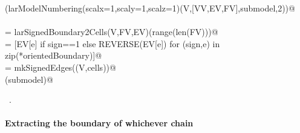 \documentclass[11pt,oneside]{article}    %
\begin{document}
\begin{flushleft}
\begin{list}{}{}
\mbox{}\verb@VIEW(larModelNumbering(scalx=1,scaly=1,scalz=1)(V,[VV,EV,FV],submodel,2))@\\
\mbox{}\verb@@\\
\mbox{}\verb@orientedBoundary = larSignedBoundary2Cells(V,FV,EV)(range(len(FV)))@\\
\mbox{}\verb@cells = [EV[e] if sign==1 else REVERSE(EV[e]) for (sign,e) in zip(*orientedBoundary)]@\\
\mbox{}\verb@submodel = mkSignedEdges((V,cells))@\\
\mbox{}\verb@VIEW(submodel)@\\
\mbox{}\verb@@{\NWsep}
\end{list}
\vspace{-1ex}
\footnotesize\addtolength{\baselineskip}{-1ex}
\begin{list}{}{\setlength{\itemsep}{-\parsep}\setlength{\itemindent}{-\leftmargin}}
\item \NWtxtMacroRefIn\ .
\end{list}
\end{flushleft}


\paragraph{Extracting the boundary of whichever chain}
\end{document}
